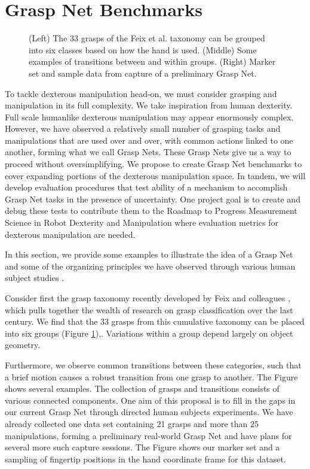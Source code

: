 \section{Grasp Net Benchmarks}   
    \label{secGraspNet}
 
\begin{figure}
\begin{center}
\vspace*{2in}
\end{center}
\caption[]{(Left) The 33 grasps of the Feix et al. taxonomy can be grouped into six classes based on how the hand is used. (Middle) Some examples of transitions between and within groups.  (Right) Marker set and sample data from capture of a preliminary Grasp Net.}
\label{GraspNet}
\end{figure}

To tackle dexterous manipulation head-on, we must consider grasping and manipulation in its full complexity.   We take inspiration from human dexterity.   Full scale humanlike dexterous manipulation may appear enormously complex.   However,  we have observed a relatively small number of grasping tasks and manipulations that are used over and over, with common actions linked to one another, forming what we call Grasp Nets.   These Grasp Nets give us a way to proceed without oversimplifying.  We propose to create Grasp Net benchmarks to cover expanding portions of the dexterous manipulation space.   In tandem, we will develop evaluation procedures that test ability of a mechanism to accomplish Grasp Net tasks in the presence of uncertainty.   One project goal is to create and debug these tests to contribute them to the Roadmap to Progress Measurement Science in Robot Dexterity and Manipulation \cite{falco2014roadmap} where evaluation metrics for dexterous manipulation are needed.   

In this section, we provide some examples to illustrate the idea of a Grasp Net and some of the organizing principles we have observed through various human subject studies \cite{Liu2014, JiaDatabase, Chang:2009:RSSWorkshop, Chang:2014, liu2016annotating}.   

Consider first the grasp taxonomy recently developed by Feix and colleagues \cite{feixgrasp}, which pulls together the wealth of research on grasp classification over the last century.   We find that the 33 grasps from this cumulative taxonomy can be placed into six groups (Figure \ref{GraspNet}),.  Variations within a group depend largely on object geometry.

Furthermore, we observe common transitions between these categories, such that a brief motion causes a robust transition from one grasp to another.   The Figure shows several examples.   The collection of grasps and transitions consists of various connected components.   One aim of this proposal is to fill in the gaps in our current Grasp Net through directed human subjects experiments.   We have already collected one data set containing 21 grasps and more than 25 manipulations, forming a preliminary real-world Grasp Net and have plans for several more such capture sessions.   The Figure shows our marker set and a sampling of fingertip positions in the hand coordinate frame for this dataset.
